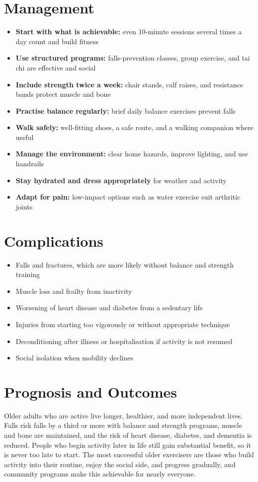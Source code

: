 \section*{Management}
\begin{itemize}
    \item \textbf{Start with what is achievable:} even 10-minute sessions several times a day count and build fitness
    \item \textbf{Use structured programs:} falls-prevention classes, group exercise, and tai chi are effective and social
    \item \textbf{Include strength twice a week:} chair stands, calf raises, and resistance bands protect muscle and bone
    \item \textbf{Practise balance regularly:} brief daily balance exercises prevent falls
    \item \textbf{Walk safely:} well-fitting shoes, a safe route, and a walking companion where useful
    \item \textbf{Manage the environment:} clear home hazards, improve lighting, and use handrails
    \item \textbf{Stay hydrated and dress appropriately} for weather and activity
    \item \textbf{Adapt for pain:} low-impact options such as water exercise suit arthritic joints
\end{itemize}

\section*{Complications}
\begin{itemize}
    \item Falls and fractures, which are more likely without balance and strength training
    \item Muscle loss and frailty from inactivity
    \item Worsening of heart disease and diabetes from a sedentary life
    \item Injuries from starting too vigorously or without appropriate technique
    \item Deconditioning after illness or hospitalisation if activity is not resumed
    \item Social isolation when mobility declines
\end{itemize}

\section*{Prognosis and Outcomes}
Older adults who are active live longer, healthier, and more independent lives. Falls risk falls by a third or more with balance and strength programs, muscle and bone are maintained, and the risk of heart disease, diabetes, and dementia is reduced. People who begin activity later in life still gain substantial benefit, so it is never too late to start. The most successful older exercisers are those who build activity into their routine, enjoy the social side, and progress gradually, and community programs make this achievable for nearly everyone.

